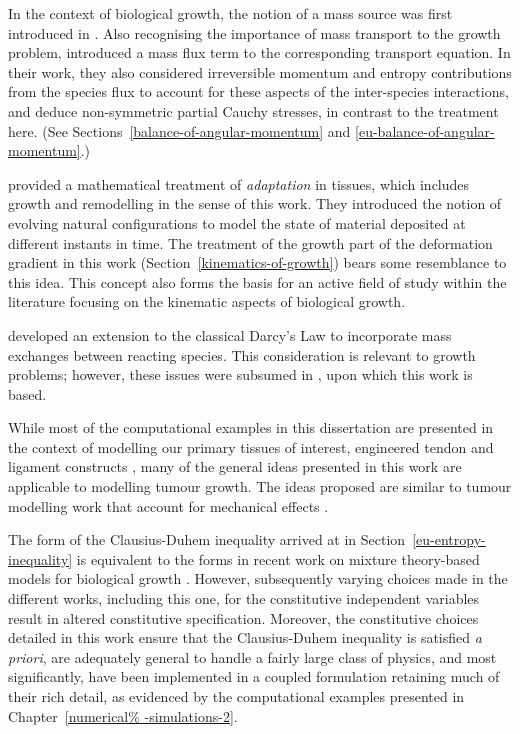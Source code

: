In the context of biological growth, the notion of a mass source was
first introduced in \citet{CowinHegedus:76}. Also recognising the
importance of mass transport to the growth problem,
\citet{EpsteinMaugin:2000} introduced a mass flux term to the
corresponding transport equation. In their work, they also considered
irreversible momentum and entropy contributions from the species flux
to account for these aspects of the inter-species interactions, and
deduce non-symmetric partial Cauchy stresses, in contrast to the
treatment here. (See Sections~\ref{balance-of-angular-momentum} and
\ref{eu-balance-of-angular-momentum}.)

\citet{HumphreyRajagopal:02} provided a mathematical treatment of
\emph{adaptation} in tissues, which includes growth and remodelling in
the sense of this work. They introduced the notion of evolving natural
configurations to model the state of material deposited at different
instants in time. The treatment of the growth part of the deformation
gradient in this work (Section~\ref{kinematics-of-growth}) bears some
resemblance to this idea. This concept also forms the basis for an
active field of study within the literature \citep{Skalak:81,
  SkalakHoger:96, Klischetal:2001, TaberHumphrey:2001,
  LubardaHoger:02, AmbrosiMollica:2002} focusing on the kinematic
aspects of biological growth.

\citet{PreziosiFarina:2002} developed an extension to the classical
Darcy's Law to incorporate mass exchanges between reacting
species. This consideration is relevant to growth problems; however,
these issues were subsumed in \citet{growthpaper}, upon which this
work is based.

While most of the computational examples in this dissertation are
presented in the context of modelling our primary tissues of interest,
engineered tendon and ligament constructs \citep{Calve:04,ma:07}, many
of the general ideas presented in this work are applicable to
modelling tumour growth. The ideas proposed are similar to tumour
modelling work that account for mechanical effects
\citep{Jackson-Byrne:02,Byrneetal:06}.

The form of the Clausius-Duhem inequality arrived at in
Section~\ref{eu-entropy-inequality} is equivalent to the forms in
recent work on mixture theory-based models for biological growth
\citep{loret05, ateshian07}. However, subsequently varying choices
made in the different works, including this one, for the constitutive
independent variables result in altered constitutive
specification. Moreover, the constitutive choices detailed in this
work ensure that the Clausius-Duhem inequality is satisfied {\em a
  priori}, are adequately general to handle a fairly large class of
physics, and most significantly, have been implemented in a coupled
formulation retaining much of their rich detail, as evidenced by the
computational examples presented in Chapter~\ref{numerical%
  -simulations-2}.

